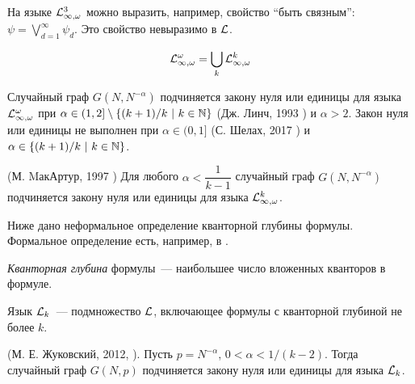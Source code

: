 На языке $\mathcal{L}^3_{\infty, \omega}$ можно выразить, например, свойство ``быть связным'': $\psi = \bigvee_{d=1}^\infty \psi_d$.
Это свойство невыразимо в $\mathcal{L}$.

\Def \[\mathcal{L}^\omega_{\infty, \omega} = \bigcup_k \mathcal{L}^k_{\infty, \omega} \]

\begin{theorem}
Случайный граф $G(N, N^{-\alpha})$ подчиняется закону нуля или единицы для языка $\mathcal{L}^\omega_{\infty, \omega}$ при $\alpha \in (1,2] \setminus \{(k+1)/k ~|~ k \in \mathbb {N} \}$ (Дж. Линч, 1993  \cite{lynch1993infinitary}) и $\alpha > 2$.
Закон нуля или единицы не выполнен при $\alpha \in (0,1]$ (С. Шелах, 2017 \cite{shelah2017failure})  и $\alpha \in \{(k+1)/k ~|~ k \in \mathbb {N} \}$.
\end{theorem}

\begin{theorem} (М. MакАртур, 1997 \cite{mcarthur1997asymptotic})
Для любого $\alpha < \dfrac{1}{k-1}$ случайный граф $G(N, N^{-\alpha})$ подчиняется закону нуля или единицы для языка $\mathcal{L}^k_{\infty, \omega}$.
\end{theorem}

Ниже дано неформальное определение кванторной глубины формулы.
Формальное определение есть, например, в \cite{shen}.

\Def \textit{Кванторная глубина} формулы~--- наибольшее число вложенных кванторов в формуле.

\Def Язык $\mathcal{L}_k$~--- подмножество $\mathcal{L}$, включающее формулы с кванторной глубиной не более $k$.

\begin{theorem}(М. Е. Жуковский, 2012, \cite{zhukovskii2012zero}). Пусть $p=N^{-\alpha}$, $0 < \alpha < 1/(k - 2)$. 
Тогда случайный граф $G(N, p)$ подчиняется закону нуля или единицы для языка $\mathcal{L}_k$.
\end{theorem}